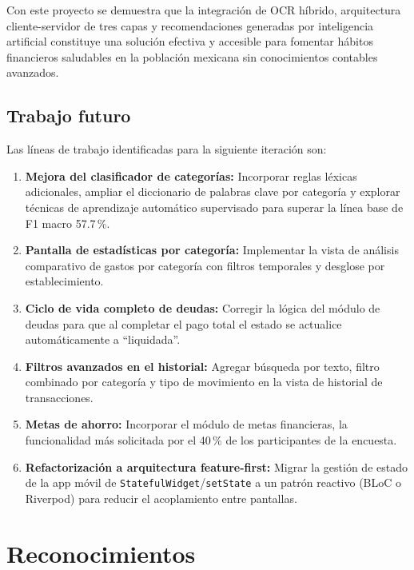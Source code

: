 \documentclass[10pt,twocolumn,letterpaper]{article}
\begin{document}
Con este proyecto se demuestra que la integración de OCR híbrido, arquitectura cliente-servidor
de tres capas y recomendaciones generadas por inteligencia artificial constituye una solución
efectiva y accesible para fomentar hábitos financieros saludables en la población mexicana sin
conocimientos contables avanzados.

\subsection{Trabajo futuro}

Las líneas de trabajo identificadas para la siguiente iteración son:

\begin{enumerate}[noitemsep,topsep=2pt]
  \item \textbf{Mejora del clasificador de categorías:} Incorporar reglas léxicas adicionales,
    ampliar el diccionario de palabras clave por categoría y explorar técnicas de aprendizaje
    automático supervisado para superar la línea base de F1 macro 57.7\,\%.
  \item \textbf{Pantalla de estadísticas por categoría:} Implementar la vista de análisis
    comparativo de gastos por categoría con filtros temporales y desglose por establecimiento.
  \item \textbf{Ciclo de vida completo de deudas:} Corregir la lógica del módulo de deudas
    para que al completar el pago total el estado se actualice automáticamente a ``liquidada''.
  \item \textbf{Filtros avanzados en el historial:} Agregar búsqueda por texto, filtro
    combinado por categoría y tipo de movimiento en la vista de historial de transacciones.
  \item \textbf{Metas de ahorro:} Incorporar el módulo de metas financieras, la
    funcionalidad más solicitada por el 40\,\% de los participantes de la encuesta.
  \item \textbf{Refactorización a arquitectura feature-first:} Migrar la gestión de estado
    de la app móvil de \texttt{StatefulWidget}/\texttt{setState} a un patrón reactivo
    (BLoC o Riverpod) para reducir el acoplamiento entre pantallas.
\end{enumerate}


\section*{Reconocimientos}
\end{document}
